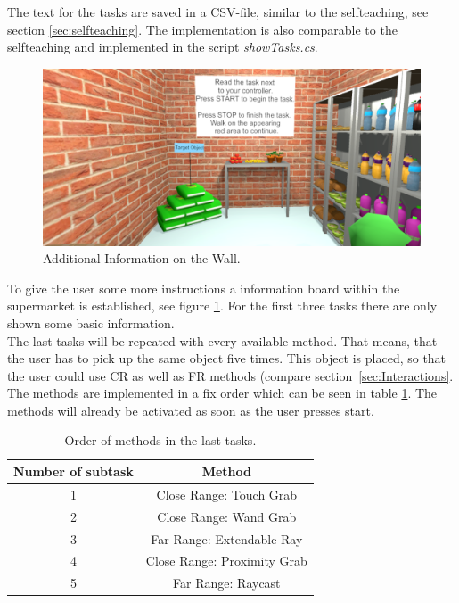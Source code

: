 The text for the tasks are saved in a CSV-file, similar to the selfteaching, see section \ref{sec:selfteaching}. The implementation is also comparable to the selfteaching and implemented in the script \textit{showTasks.cs}.

\begin{figure}[H] 
	\center 
	\includegraphics[width=12cm]{Images/TaskWall_1.PNG}
	\caption[Additional Information on the Wall.]{Additional Information on the Wall.}
	\label{fig:taskW1}
\end{figure}

To give the user some more instructions a information board within the supermarket is established, see figure \ref{fig:taskW1}. For the first three tasks there are only shown some basic information.\\
The last tasks will be repeated with every available method. That means, that the user has to pick up the same object five times. This object is placed, so that the user could use CR as well as FR methods (compare section~\ref{sec:Interactions}. The methods are implemented in a fix order which can be seen in table \ref{tab: OrderMethods}. The methods will already be activated as soon as the user presses start. \\

\begin{table}[h]
\centering
 \begin{tabular}{|c|c|}
  Number of subtask & Method  \\ \hline
  1 & Close Range: Touch Grab  \\
  2 & Close Range: Wand Grab  \\
  3 & Far Range: Extendable Ray  \\
  4 & Close Range: Proximity Grab  \\
  5 & Far Range: Raycast \\
   \end{tabular}
  \caption[Order of methods in the last tasks.]{Order of methods in the last tasks.}
	\label{tab: OrderMethods}
 \end{table}

